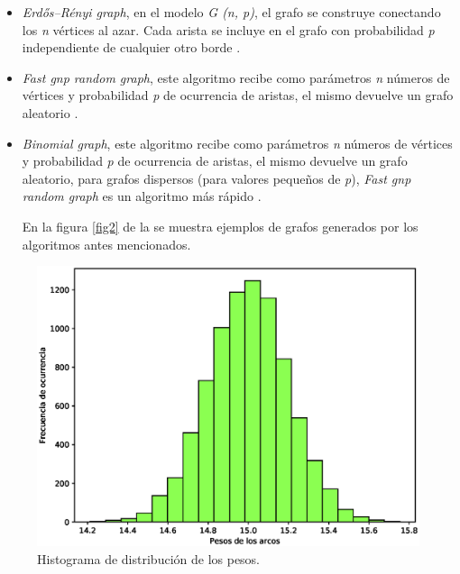 \documentclass{article}
\begin{document}
\begin{itemize}
  \item\textit{Erdős–Rényi graph}, en el modelo \textit {G (n, p)}, el grafo se construye conectando los \textit{n} vértices al azar. Cada arista se incluye en el grafo con probabilidad \textit{p} independiente de cualquier otro borde \cite{erg}.
    
   \item\textit{Fast gnp random graph}, este algoritmo recibe como parámetros \textit{n} números de vértices y probabilidad \textit{p} de ocurrencia de aristas, el mismo devuelve un grafo aleatorio \cite{rgf}.
   
	\item\textit{Binomial graph}, este algoritmo recibe como parámetros \textit{n} números de vértices y probabilidad \textit{p} de ocurrencia de aristas, el mismo devuelve un grafo aleatorio, para grafos dispersos (para valores pequeños de \textit{p}), \textit{Fast gnp random graph} es un algoritmo más rápido \cite{bg}.
	
En la figura \ref{fig2} de la \pageref{fig2} se muestra ejemplos de grafos generados por los algoritmos antes mencionados.
\end{itemize}
\begin{center}
\begin{figure}[h]
\includegraphics[scale=0.7]{histograf.eps}
\caption{Histograma de distribución de los pesos.}
\label{fig1}
\end{figure}
\end{center}
\end{document}

